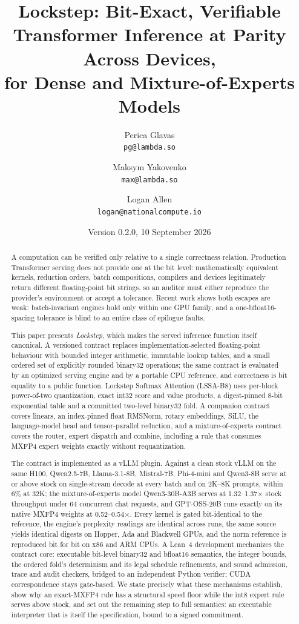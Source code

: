 \documentclass{article}
\title{Lockstep: Bit-Exact, Verifiable Transformer Inference at Parity Across Devices,\\
for Dense and Mixture-of-Experts Models}
\date{Version 0.2.0, 10 September 2026}
\author{Perica Glavas\\ \small\texttt{pg@lambda.so} \and Maksym Yakovenko\\ \small\texttt{max@lambda.so} \and Logan Allen\\ \small\texttt{logan@nationalcompute.io}}
\begin{document}
\maketitle

\begin{abstract}
A computation can be verified only relative to a single correctness relation.  Production
Transformer serving does not provide one at the bit level: mathematically equivalent
kernels, reduction orders, batch compositions, compilers and devices legitimately return
different floating-point bit strings, so an auditor must either reproduce the provider's
environment or accept a tolerance.  Recent work shows both escapes are weak: batch-invariant
engines hold only within one GPU family, and a one-bfloat16-spacing tolerance is blind to an
entire class of epilogue faults.

This paper presents \emph{Lockstep}, which makes the served inference function itself
canonical.  A versioned contract replaces implementation-selected floating-point behaviour
with bounded integer arithmetic, immutable lookup tables, and a small ordered set of
explicitly rounded binary32 operations; the same contract is evaluated by an optimized
serving engine and by a portable CPU reference, and correctness is bit equality to a public
function.  Lockstep Softmax Attention (LSSA-B8) uses per-block power-of-two quantization,
exact int32 score and value products, a digest-pinned 8-bit exponential table and a
committed two-level binary32 fold.  A companion contract covers linears, an index-pinned
float RMSNorm, rotary embeddings, SiLU, the language-model head and tensor-parallel
reduction, and a mixture-of-experts contract covers the router, expert dispatch and combine,
including a rule that consumes MXFP4 expert weights exactly without requantization.

The contract is implemented as a vLLM plugin.  Against a clean stock vLLM on the same H100,
Qwen2.5-7B, Llama-3.1-8B, Mistral-7B, Phi-4-mini and Qwen3-8B serve at or above stock on
single-stream decode at every batch and on 2K--8K prompts, within 6\% at 32K; the
mixture-of-experts model Qwen3-30B-A3B serves at 1.32--1.37$\times$ stock throughput under 64
concurrent chat requests, and GPT-OSS-20B runs exactly on its native MXFP4 weights at
0.52--0.54$\times$.  Every
kernel is gated bit-identical to the reference, the engine's perplexity readings are
identical across runs, the same source yields identical digests on Hopper, Ada and
Blackwell GPUs, and the norm reference is reproduced bit for bit on x86 and ARM CPUs.  A Lean~4 development mechanizes the contract core: executable bit-level binary32 and
bfloat16 semantics, the integer bounds, the ordered fold's determinism and its legal
schedule refinements, and sound admission, trace and audit checkers, bridged to an
independent Python verifier; CUDA correspondence stays gate-based.  We state precisely what
these mechanisms establish, show why an exact-MXFP4 rule has a structural speed floor while the int8 expert rule serves
above stock, and set out the remaining step to full semantics: an executable interpreter that is
itself the specification, bound to a signed commitment.
\end{abstract}
\end{document}
